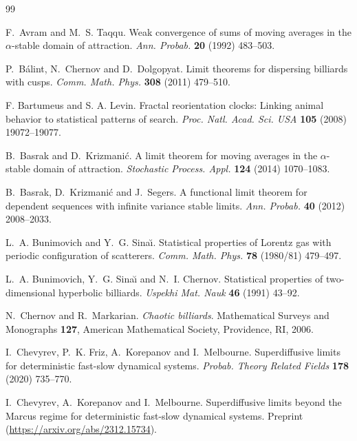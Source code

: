 \documentclass[12pt]{article}
\numberwithin{equation}{section}
\begin{document}
\begin{thebibliography}{99}

F.~Avram and M.~S. Taqqu. Weak convergence of sums of moving averages in the
  {$\alpha$}-stable domain of attraction. \emph{Ann. Probab.} \textbf{20}
  (1992) 483--503.

P.~B{\'a}lint, N.~Chernov and D.~Dolgopyat. Limit theorems for dispersing
  billiards with cusps. \emph{Comm. Math. Phys.} \textbf{308} (2011) 479--510.

F. Bartumeus and S. A. Levin.
Fractal reorientation clocks: Linking animal behavior to statistical patterns of search.
\emph{Proc. Natl. Acad. Sci. USA} \textbf{105} (2008) 19072--19077.

B.~Basrak and D.~Krizmani\'{c}. A limit theorem for moving averages in the
  {$\alpha$}-stable domain of attraction. \emph{Stochastic Process. Appl.}
  \textbf{124} (2014) 1070--1083.

B.~Basrak, D.~Krizmani\'c and J.~Segers. A functional limit theorem for
  dependent sequences with infinite variance stable limits. \emph{Ann. Probab.}
  \textbf{40} (2012) 2008--2033.

L.~A. Bunimovich and Y.~G. Sina{\u\i}. Statistical properties of {L}orentz gas
  with periodic configuration of scatterers. \emph{Comm. Math. Phys.}
  \textbf{78} (1980/81) 479--497.

L.~A. Bunimovich, Y.~G. Sina{\u\i} and N.~I. Chernov. Statistical properties
  of two-dimensional hyperbolic billiards. \emph{Uspekhi Mat. Nauk} \textbf{46}
  (1991) 43--92.

N.~Chernov and R.~Markarian. \emph{Chaotic billiards}. Mathematical Surveys and
  Monographs \textbf{127}, American Mathematical Society, Providence, RI, 2006.

I.~Chevyrev, P.~K. Friz, A.~Korepanov and I.~Melbourne. Superdiffusive limits
  for deterministic fast-slow dynamical systems. \emph{Probab. Theory Related
  Fields} \textbf{178} (2020) 735--770.

I.~Chevyrev, A.~Korepanov and I.~Melbourne.
Superdiffusive limits beyond the Marcus regime for deterministic fast-slow dynamical systems. 
Preprint
(\url{https://arxiv.org/abs/2312.15734}).


\end{thebibliography}
\end{document}
